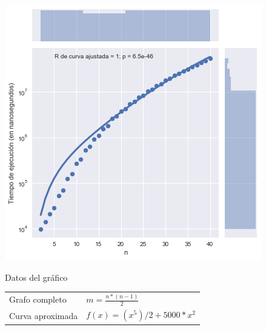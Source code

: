 \noindent
\begin{minipage}{0.55\textwidth}
    \hfill
    \includegraphics[scale=0.6]{img/local-n-log.png}
\end{minipage}
\hfill
\begin{minipage}{0.44\textwidth}
    \begin{center}
        Datos del gráfico

        \begin{tabular}{ | l l |}
            \hline
            Grafo completo & $m = \frac{n * (n-1)}{2}$\\ 
            Curva aproximada & $f(x) = (x^5) / 2 + 5000 * x^2$ \\
            \hline
        \end{tabular}
    \end{center}
\end{minipage}

